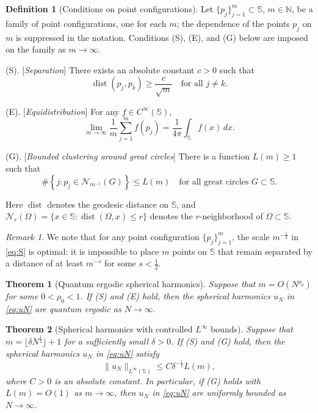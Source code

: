 \documentclass[12pt,reqno]{amsart}
\DeclareMathOperator{\dist}{dist}
\newcommand{\N}{\mathbb{N}}
\newcommand{\Nc}{\mathcal{N}}
\newcommand{\Sb}{\mathbb{S}}
\theoremstyle{plain}
\newtheorem{thm}{Theorem}[section]
\theoremstyle{definition}
\newtheorem*{defn}{Definition}
\theoremstyle{remark}
\newtheorem*{rmk}{Remark}
\numberwithin{equation}{section}
\begin{document}
\begin{defn}[Conditions on point configurations]
Let $\{p_j\}_{j=1}^m\subset\Sb$, $m\in\N$, be a family of point configurations, one for each $m$; the dependence of the points $p_j$ on $m$ is suppressed in the notation. Conditions (S), (E), and (G) below are imposed on the family as $m\to\infty$.

(S). [\textit{Separation}] There exists an absolute constant $c>0$ such that
\begin{equation}\label{eq:S}
\dist\left(p_j,p_k\right)\ge\frac{c}{\sqrt m}\quad\text{for all }j\ne k.
\end{equation}

(E). [\textit{Equidistribution}] For any $f\in C^\infty(\Sb)$,
\begin{equation}\label{eq:E}
\lim_{m\to\infty}\frac1m\sum_{j=1}^m f\left(p_j\right)=\frac{1}{4\pi}\int_\Sb f(x)\,dx.
\end{equation}

(G). [\textit{Bounded clustering around great circles}] There is a function $L(m)\ge1$ such that
\begin{equation}\label{eq:G}
\#\left\{j:p_j\in\Nc_{m^{-1}}(G)\right\}\le L(m)\quad\text{for all great circles }G\subset\Sb.
\end{equation}

Here $\dist$ denotes the geodesic distance on $\Sb$, and $\Nc_r(\Omega)=\{x\in\Sb:\dist(\Omega,x)\le r\}$ denotes the $r$-neighborhood of $\Omega\subset\Sb$.
\end{defn}

\begin{rmk}
We note that for any point configuration $\{p_j\}_{j=1}^m$, the scale $m^{-\frac12}$ in \eqref{eq:S} is optimal: it is impossible to place $m$ points on $\Sb$ that remain separated by a distance of at least $m^{-s}$ for some $s<\frac12$.
\end{rmk}

\begin{thm}[Quantum ergodic spherical harmonics]\label{thm:QE}
Suppose that $m=O(N^{\rho_0})$ for some $0<\rho_0<1$. If (S) and (E) hold, then the spherical harmonics $u_N$ in \eqref{eq:uN} are quantum ergodic as $N\to\infty$.
\end{thm}

\begin{thm}[Spherical harmonics with controlled $L^\infty$ bounds]\label{thm:BddSHs}
Suppose that $m=\lfloor\delta N^\frac12\rfloor+1$ for a sufficiently small $\delta>0$. If (S) and (G) hold, then the spherical harmonics $u_N$ in \eqref{eq:uN} satisfy
$$\|u_N\|_{L^\infty(\Sb)}\le C\delta^{-\frac12}L(m),$$
where $C>0$ is an absolute constant. In particular, if (G) holds with $L(m)=O(1)$ as $m\to\infty$, then $u_N$ in \eqref{eq:uN} are uniformly bounded as $N\to\infty$.
\end{thm}
\end{document}
